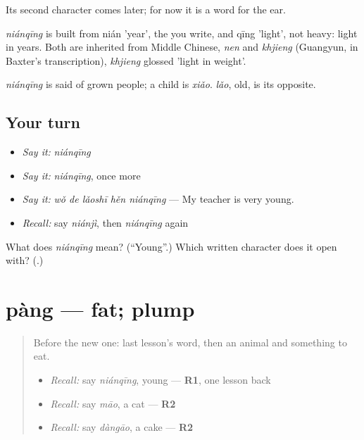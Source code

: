Its second character comes later; for now it is a word for the ear.

\begin{cousinweb}
\emph{niánqīng} is built from nián 'year', the  you write, and qīng 'light', not heavy: light in years. Both are inherited from Middle Chinese, \emph{nen} and \emph{khjieng} (Guangyun, in Baxter's transcription), \emph{khjieng} glossed 'light in weight'.
\end{cousinweb}

\begin{grammarlens}[title={What you've built}]
\emph{niánqīng} is said of grown people; a child is \emph{xiǎo}. \emph{lǎo}, old, is its opposite.
\end{grammarlens}

\subsection*{Your turn}
\begin{itemize}
\raggedright
  \item \emph{Say it:} \emph{niánqīng}
  \item \emph{Say it:} \emph{niánqīng}, once more
  \item \emph{Say it:} \emph{wǒ de lǎoshī hěn niánqīng} — My teacher is very young.
  \item \emph{Recall:} say \emph{niánjì}, then \emph{niánqīng} again
\end{itemize}

\begin{tcolorbox}[breakable,colback=teal!4,colframe=teal!35!black,title={Before you move on}]
What does \emph{niánqīng} mean? (\textquotedblleft{}Young\textquotedblright{}.) Which written character does it open with? (\textbf{}.)
\end{tcolorbox}
\section[pàng]{pàng — fat; plump}

\label{lesson:ZH-C94-pang}



\begin{quote}
Before the new one: last lesson's word, then an animal and something to eat.

\begin{itemize}
\raggedright
  \item \emph{Recall:} say \emph{niánqīng}, young — \textbf{R1}, one lesson back
  \item \emph{Recall:} say \emph{māo}, a cat — \textbf{R2}
  \item \emph{Recall:} say \emph{dàngāo}, a cake — \textbf{R2}
\end{itemize}
\end{quote}

